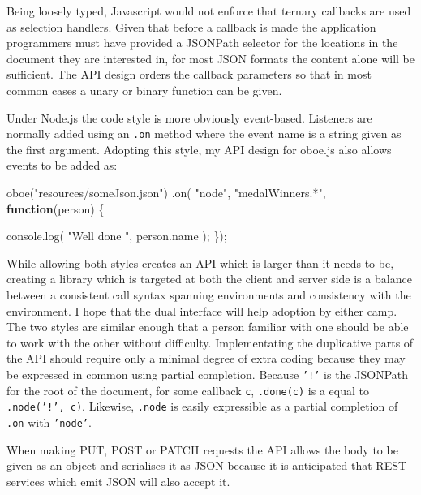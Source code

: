 \documentclass[12pt, ]{article}
\newenvironment{Shaded}{}{}
\newcommand{\KeywordTok}[1]{\textcolor[rgb]{0.00,0.44,0.13}{\textbf{{#1}}}}
\newcommand{\StringTok}[1]{\textcolor[rgb]{0.25,0.44,0.63}{{#1}}}
\newcommand{\OtherTok}[1]{\textcolor[rgb]{0.00,0.44,0.13}{{#1}}}
\newcommand{\FunctionTok}[1]{\textcolor[rgb]{0.02,0.16,0.49}{{#1}}}
\newcommand{\NormalTok}[1]{{#1}}
\begin{document}
Being loosely typed, Javascript would not enforce that ternary callbacks
are used as selection handlers. Given that before a callback is made the
application programmers must have provided a JSONPath selector for the
locations in the document they are interested in, for most JSON formats
the content alone will be sufficient. The API design orders the callback
parameters so that in most common cases a unary or binary function can
be given.

Under Node.js the code style is more obviously event-based. Listeners
are normally added using an \texttt{.on} method where the event name is
a string given as the first argument. Adopting this style, my API design
for oboe.js also allows events to be added as:

\begin{Shaded}
\begin{Highlighting}[]
\FunctionTok{oboe}\NormalTok{(}\StringTok{"resources/someJson.json"}\NormalTok{)}
   \NormalTok{.}\FunctionTok{on}\NormalTok{( }\StringTok{"node"}\NormalTok{, }\StringTok{"medalWinners.*"}\NormalTok{, }\KeywordTok{function}\NormalTok{(person) \{}
   
      \OtherTok{console}\NormalTok{.}\FunctionTok{log}\NormalTok{( }\StringTok{"Well done "}\NormalTok{, }\OtherTok{person}\NormalTok{.}\FunctionTok{name} \NormalTok{);}
   \NormalTok{\});}
\end{Highlighting}
\end{Shaded}

While allowing both styles creates an API which is larger than it needs
to be, creating a library which is targeted at both the client and
server side is a balance between a consistent call syntax spanning
environments and consistency with the environment. I hope that the dual
interface will help adoption by either camp. The two styles are similar
enough that a person familiar with one should be able to work with the
other without difficulty. Implementating the duplicative parts of the
API should require only a minimal degree of extra coding because they
may be expressed in common using partial completion. Because
\texttt{'!'} is the JSONPath for the root of the document, for some
callback \texttt{c}, \texttt{.done(c)} is a equal to
\texttt{.node('!', c)}. Likewise, \texttt{.node} is easily expressible
as a partial completion of \texttt{.on} with \texttt{'node'}.

When making PUT, POST or PATCH requests the API allows the body to be
given as an object and serialises it as JSON because it is anticipated
that REST services which emit JSON will also accept it.
\end{document}
